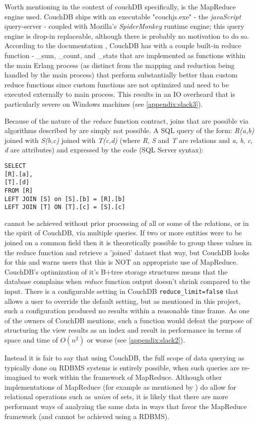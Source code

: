Worth mentioning in the context of couchDB specifically, is the MapReduce engine used. CouchDB ships with an executable "couchjs.exe" - the \textit{javaScript} query-server - coupled with Mozilla's \textit{SpiderMonkey} runtime engine; this query engine is drop-in replaceable, although there is probably no motivation to do so. According to the documentation \cite{builtincouchreduce}, CouchDB has with a couple built-in reduce function - \_sum, \_count, and \_stats that are implemented as functions within the main Erlang process (as distinct from the mapping and reduction being handled by the main process) that perform substantially better than custom reduce functions since custom functions are not optimized and need to be executed externally to main process. This results in an I\/O overheard that is particularly severe on Windows machines (see \ref{appendix:slack3}).

Because of the nature of the \textit{reduce} function contract, joins that are possible via algorithms described by \cite{chandar2010} are simply not possible. A SQL query of the form: \textit{R(a,b)} joined with \textit{S(b,c)} joined with \textit{T(c,d)} (where \textit{R}, \textit{S} and \textit{T} are relations and \textit{a}, \textit{b}, \textit{c}, \textit{d} are attributes) and expressed by the code (SQL Server syntax):

\begin{verbatim}
SELECT
[R].[a],
[T].[d]
FROM [R]
LEFT JOIN [S] on [S].[b] = [R].[b]
LEFT JOIN [T] ON [T].[c] = [S].[c]
\end{verbatim}

cannot be achieved without prior processing of all or some of the relations, or in the spirit of CouchDB, via multiple queries. If two or more entities were to be joined on a common field then it is theoretically possible to group these values in the reduce function and retrieve a 'joined' dataset that way, but CouchDB looks for this and warns users that this is NOT an appropriate use of MapReduce. CouchDB's optimization of it's B+tree storage structures means that the database complains when \textit{reduce} function output doesn't shrink compared to the input. There is a configurable setting in CouchDB \texttt{reduce_limit=false} that allows a user to override the default setting, but as mentioned in this project, such a configuration produced no results within a reasonable time frame. As one of the owners of CouchDB mentions, such a function would defeat the purpose of structuring the view results as an index and result in performance in terms of space and time of $ O(n^2) $ or worse (see \ref{appendix:slack2}).

Instead it is fair to say that using CouchDB, the full scope of data querying as typically done on RDBMS systems is entirely possible, when such queries are re-imagined to work within the framework of MapReduce. Although other implementations of MapReduce (for example as mentioned by \cite{chandar2010}) do allow for relational operations such as \textit{union} of sets, it is likely that there are more performant ways of analyzing the same data in ways that favor the MapReduce framework (and cannot be achieved using a RDBMS).